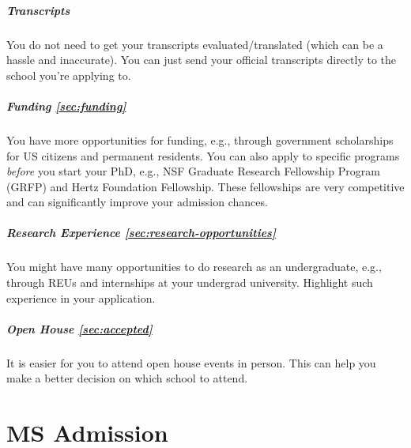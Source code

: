 \documentclass[oneside,11pt,dvipsnames]{book}
\newenvironment{domesticbox}[1][]{
  \small
  \begin{mydomesticbox}
    {\small \textbf{#1}}
  }{
  \end{mydomesticbox}
}
\def\chapterinfo#1{%
  \addcontentsline{toc}{chapterinfo}{%
    \noexpand\numberline{}\color{black}{#1}}%
}
\begin{document}
\paragraph{Transcripts} You do not need to get your transcripts evaluated/translated (which can be a hassle and inaccurate).  You can just send your official transcripts directly to the school you're applying to.

\paragraph{Funding \autoref{sec:funding}} You have more opportunities for funding, e.g., through government scholarships for US citizens and permanent residents.  You can also apply to specific programs \emph{before} you start your PhD, e.g., NSF Graduate Research Fellowship Program (GRFP) and Hertz Foundation Fellowship.  These fellowships are very competitive and can significantly improve your admission chances.

\paragraph{Research Experience \autoref{sec:research-opportunities}} You might have many opportunities to do research as an undergraduate, e.g., through REUs and internships at your undergrad university.  Highlight such experience in your application.

\paragraph{Open House \autoref{sec:accepted}} It is easier for you to attend open house events in person.  This can help you make a better decision on which school to attend.


\chapter{MS Admission}\label{chap:ms}
\chapterinfo{MS focuses on coursework and prepares you for industry, while PhD focuses on research and prepares you for academia or research.}
\end{document}
